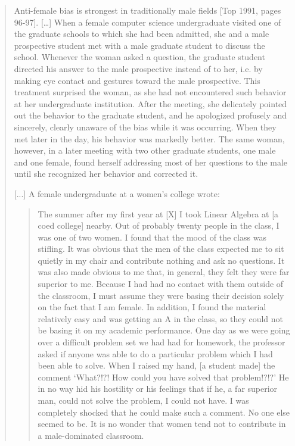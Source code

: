 \begin{quote}
Anti-female bias is strongest in traditionally male fields [Top 1991,
pages 96-97].  [\dots]
When a female computer science undergraduate visited
    one of the graduate schools to which she had been admitted, she and a male prospective student met with a
    male graduate student to discuss the school. Whenever
    the woman asked a question, the graduate student directed his answer to the male prospective instead of to
    her, i.e. by making eye contact and gestures toward the
    male prospective. This treatment surprised the woman,
    as she had not encountered such behavior at her undergraduate institution.  After the meeting, she delicately
    pointed out the behavior to the graduate student, and he
    apologized profusely and sincerely, clearly unaware of the
    bias while it was occurring. When they met later in the
    day, his behavior was markedly better. The same woman,
    however, in a later meeting with two other graduate students, one male and one female, found herself addressing
    most of her questions to the male until she recognized her
    behavior and corrected it.

[...]
A female undergraduate at a women's college wrote:
\begin{quote}
         The summer after my first year at [X] I took
         Linear Algebra at [a coed college] nearby. Out
         of probably twenty people in the class, I was
         one of two women. I found that the mood of the
         class was stifling. It was obvious that the men
         of the class expected me to sit quietly in my
         chair and contribute nothing and ask no questions. It was also made obvious to me that, in
         general, they felt they were far superior to me.
         Because I had had no contact with them outside of the classroom, I must assume they were
         basing their decision solely on the fact that I am
         female. In addition, I found the material relatively easy and was getting an A in the class,
         so they could not be basing it on my academic
         performance. One day as we were going over a
         difficult problem set we had had for homework,
         the professor asked if anyone was able to do
         a particular problem which I had been able to
         solve. When I raised my hand, [a student made]
         the comment `What?!?!  How could you have
         solved that problem!?!?' He in no way hid his
         hostility or his feelings that if he, a far superior
         man, could not solve the problem, I could not
         have. I was completely shocked that he could
         make such a comment. No one else seemed to
         be.  It is no wonder that women tend not to
         contribute in a male-dominated classroom.


\end{quote}
\end{quote}
